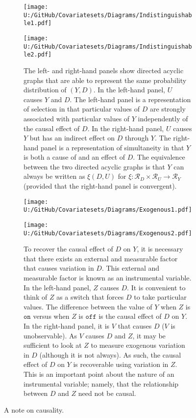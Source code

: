 \documentclass[10pt,a4paper,twoside]{article}
\numberwithin{equation}{section}
\begin{document}
\begin{figure}[p]
\centering
\begin{subfigure}{0.4\textwidth}
  \centering
  \texttt{[image: U:/GitHub/Covariatesets/Diagrams/Indistinguishable1.pdf]}
  \label{fig:indistinguishable1}
  \end{subfigure}
  \begin{subfigure}{0.4\textwidth}
  \centering
  \texttt{[image: U:/GitHub/Covariatesets/Diagrams/Indistinguishable2.pdf]}
  \label{fig:indistinguishable2}
  \end{subfigure}
\begin{subfigure}{0.8\textwidth}
  \caption{The left- and right-hand panels show directed acyclic graphs that are able to represent the same probability distribution of $(Y,D)$. In the left-hand panel, $U$ causes $Y$ and $D$. The left-hand panel is a representation of selection in that particular values of $D$ are strongly associated with particular values of $Y$ independently of the causal effect of $D$. In the right-hand panel, $U$ causes $Y$ but has an indirect effect on $D$ through $Y$. The right-hand panel is a representation of simultaneity in that $Y$ is both a cause of and an effect of $D$. The equivalence between the two directed acyclic graphs is that $Y$ can always be written as $\xi(D,U)$ for $\xi : \mathcal{R}_D\times\mathcal{R}_U\rightarrow\mathcal{R}_Y$ (provided that the right-hand panel is convergent).}
  \end{subfigure}
   \begin{subfigure}{0.4\textwidth}
  \centering
  \texttt{[image: U:/GitHub/Covariatesets/Diagrams/Exogenous1.pdf]}
  \label{fig:exogenous1}
  \end{subfigure}
   \begin{subfigure}{0.4\textwidth}
  \centering
  \texttt{[image: U:/GitHub/Covariatesets/Diagrams/Exogenous2.pdf]}
  \label{fig:exogenous2}
  \end{subfigure}
  \begin{subfigure}{0.8\textwidth}
  \caption{To recover the causal effect of $D$ on $Y$, it is necessary that there exists an external and measurable factor that causes variation in $D$. This external and measurable factor is known as an instrumental variable. In the left-hand panel, $Z$ causes $D$. It is convenient to think of $Z$ as a switch that forces $D$ to take particular values. The difference between the value of $Y$ when $Z$ is $\mathtt{on}$ versus when $Z$ is $\mathtt{off}$ is the causal effect of $D$ on $Y$. In the right-hand panel, it is $V$ that causes $D$ ($V$ is unobservable). As $V$ causes $D$ and $Z$, it may be sufficient to look at $Z$ to measure exogenous variation in $D$ (although it is not always). As such, the causal effect of $D$ on $Y$ is recoverable using variation in $Z$. This is an important point about the nature of an instrumental variable; namely, that the relationship between $D$ and $Z$ need not be causal.}
  \end{subfigure}
  \caption{A note on causality.}
  \label{fig:causality}
\end{figure}
\end{document}
